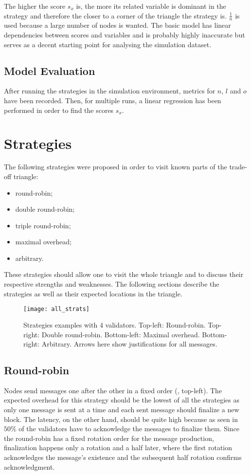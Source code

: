 The higher the score \(s_x\) is, the more its related variable is dominant in
the strategy and therefore the closer to a corner of the triangle the strategy
is.  \(\frac{1}{n}\) is used because a large number of nodes is wanted.  The
basic model has linear dependencies between scores and variables and is probably
highly inaccurate but serves as a decent starting point for analysing the
simulation dataset.

\subsection{Model Evaluation}
After running the strategies in the simulation environment, metrics for \(n\),
\(l\) and \(o\) have been recorded. Then, for multiple runs, a linear regression
has been performed in order to find the scores \(s_x\).

\section{Strategies}
\label{sec:strategies}

The following strategies were proposed in order to visit known parts of the
trade-off triangle:
\begin{itemize}
        \item round-robin;
        \item double round-robin;
        \item triple round-robin;
        \item maximal overhead;
        \item arbitrary.
\end{itemize}
These strategies should allow one to visit the whole triangle and to discuss
their respective strengths and weaknesses. The following sections describe the
strategies as well as their expected locations in the triangle.

\begin{figure}[h]
	\centering
	\texttt{[image: all\_strats]}
    \caption{Strategies examples with 4 validators. Top-left: Round-robin.
    Top-right: Double round-robin. Bottom-left: Maximal overhead. Bottom-right:
    Arbitrary. Arrows here show justifications for all messages.}
	\label{fig:allStrats}
\end{figure}

\subsection{Round-robin}
Nodes send messages one after the other in a fixed order (,
top-left). The expected overhead for this strategy should be the lowest of all
the strategies as only one message is sent at a time and each sent message
should finalize a new block.  The latency, on the other hand, should be quite
high because as seen in  \(50\%\) of the validators have to
acknowledge the messages to finalize them. Since the round-robin has a fixed
rotation order for the message production, finalization happens only a rotation
and a half later, where the first rotation acknowledges the message's existence
and the subsequent half rotation confirms acknowledgment.

